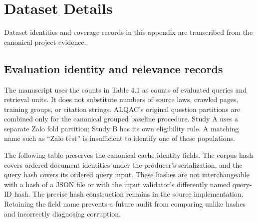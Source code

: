 \chapter{Dataset Details}

Dataset identities and coverage records in this appendix are transcribed from the canonical project evidence.
\section{Evaluation identity and relevance records}

The manuscript uses the counts in Table 4.1 as counts of evaluated queries and retrieval units. It does not substitute numbers of source laws, crawled pages, training groups, or citation strings. ALQAC's original question partitions are combined only for the canonical grouped baseline procedure. Study A uses a separate Zalo fold partition; Study B has its own eligibility rule. A matching name such as “Zalo test” is insufficient to identify one of these populations.

The following table preserves the canonical cache identity fields. The corpus hash covers ordered document identities under the producer's serialization, and the query hash covers its ordered query input. These hashes are not interchangeable with a hash of a JSON file or with the input validator's differently named query-ID hash. The precise hash construction remains in the source implementation. Retaining the field name prevents a future audit from comparing unlike hashes and incorrectly diagnosing corruption.

